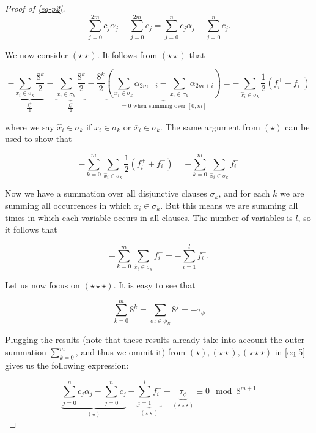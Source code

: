 \documentclass{amsart}
\newcommand{\ov}{\overline}
\theoremstyle{plain}
\begin{document}
\begin{proof}[Proof of \autoref{eq-p2}]
\begin{equation*}
  \sum_{j=0}^{2m}c_j\alpha_j-\sum_{j=0}^{2m}c_j = \sum_{j=0}^n c_j\alpha_j-\sum_{j=0}^n c_j.
\end{equation*}

We now consider $(\star\star)$. It follows from $(\star\star)$ that

\begin{equation*}
  -\underbrace{\sum_{x_i\in\sigma_k}\frac{8^k}{2}}_{\frac{f_i^+}{2}}-
  \underbrace{\sum_{\ov{x}_i\in\sigma_k}\frac{8^k}{2}}_{\frac{f_i^-}{2}}-\frac{8^k}{2}
  \underbrace{\left(\sum_{x_i\in\sigma_k}\alpha_{2m+i}-\sum_{\ov{x}_i\in\sigma_k}\alpha_{2m+i}
  \right)}_{=0\text{ when summing over $[0,m]$}} = -\sum_{\hat{x}_i\in\sigma_k}
  \frac{1}{2}\left(f_i^++f_i^-\right)
\end{equation*}

where we say $\hat{x}_i\in\sigma_k$ if $x_i\in\sigma_k$ or $\ov{x}_i\in\sigma_k$. The same argument
from $(\star)$ can be used to show that

\begin{equation*}
  -\sum_{k=0}^m\sum_{\hat{x}_i\in\sigma_k}\frac{1}{2}(f_i^++f_i^-)=-\sum_{k=0}^m\sum_{\hat{x}_i
  \in\sigma_k}f_i^-
\end{equation*}

Now we have a summation over all disjunctive clauses $\sigma_k$, and for each $k$ we are summing
all occurrences in which $\hat{x}_i\in\sigma_k$. But this means we are summing all times in which
each variable occurs in all clauses. The number of variables is $l$, so it follows that

\begin{equation*}
  -\sum_{k=0}^m\sum_{\hat{x}_i\in\sigma_k}f_i^- =-\sum_{i=1}^l f_i^-.
\end{equation*}

Let us now focus on $(\star\star\star)$. It is easy to see that

\begin{equation*}
  \sum_{k=0}^m 8^k = \sum_{\sigma_j\in\phi_R} 8^j = -\tau_\phi
\end{equation*}

Plugging the results (note that these results already take into account the outer summation
$\sum_{k=0}^m$, and thus we ommit it) from $(\star), (\star\star), (\star\star\star)$ in
\autoref{eq-5} gives us the following expression:

\begin{equation*}
  \underbrace{\sum_{j=0}^n c_j\alpha_j-\sum_{j=0}^n c_j}_{(\star)}-\underbrace{\sum_{i=1}^l
  f_i^-}_{(\star\star)}-\underbrace{\tau_\phi}_{(\star\star\star)}\equiv 0\mod 8^{m+1}
\end{equation*}


\end{proof}
\end{document}
